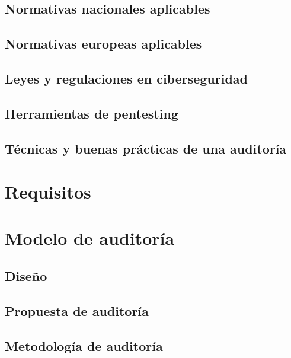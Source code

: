 \documentclass[a4paper, 10pt]{article}
\begin{document}
\subsection{Normativas nacionales aplicables}
\subsection{Normativas europeas aplicables}
\subsection{Leyes y regulaciones en ciberseguridad}
\subsection{Herramientas de pentesting}
\subsection{Técnicas y buenas prácticas de una auditoría}

\clearpage

\section{Requisitos}

\clearpage

\section{Modelo de auditoría}

\subsection{Diseño}

\subsection{Propuesta de auditoría}

\subsection{Metodología de auditoría}

\clearpage
\end{document}
